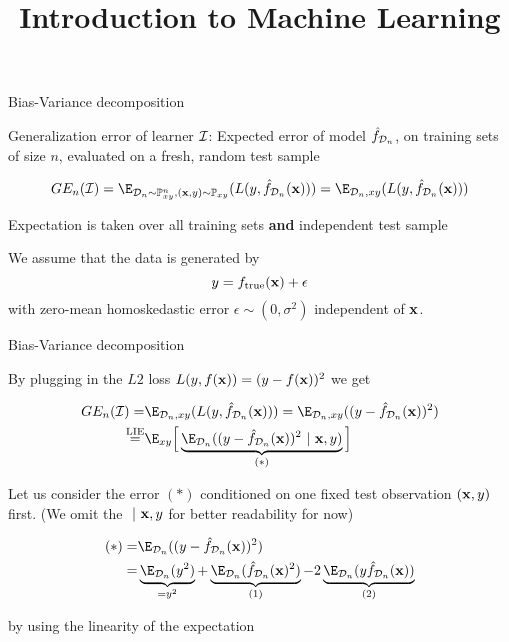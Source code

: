 \documentclass[11pt,compress,t,notes=noshow, xcolor=table]{beamer}
\title{Introduction to Machine Learning}
\begin{document}

\begin{frame}{Bias-Variance decomposition}

Generalization error of learner  $\mathcal{I}$: 
Expected error of model $\hat{f}_{\mathcal{D}_n}$, on training sets of size $n$, evaluated on a fresh, random test sample

$$GE_n(\ind) = \E_{\D_n \sim \Pxy^n, (\xv, y) \sim \Pxy}( L(y, \fh_{\D_n}(\xv)) ) = \E_{\D_n, xy}( L(y, \fh_{\D_n}(\xv)) ) $$

\vfill 

Expectation is taken over all training sets \textbf{and} independent test sample\\

\vfill 

We assume that the data is generated by 
$$
y = f_{\text{true}}(\mathbf{x}) + \epsilon
$$
with zero-mean homoskedastic error $\epsilon \sim (0, \sigma^2)$ independent of $\mathbf{x}$. 

\end{frame}

\begin{frame2}[small]{Bias-Variance decomposition}

By plugging in the $L2$ loss $L(y, f(\mathbf{x})) = (y - f(\mathbf{x}))^2$ we get

\begin{align*}
GE_n(\ind) =& \E_{\D_n, xy}( L(y, \fh_{\D_n}(\xv))) = \E_{\D_n, xy}((y - \fh_{\D_n}(\xv))^2) \\
\stackrel{\text{LIE}}{=}& \E_{xy}\Big[\underbrace{\E_{\D_n}((y - \fh_{\D_n}(\xv))^2~|~ \xv, y)}_{(*)}\Big] 
\end{align*}

Let us consider the error $(*)$ conditioned on one fixed test observation $(\mathbf{x}, y)$ first. (We omit the $~|~\mathbf{x}, y$ for better readability for now)

\begin{align*}
(*) =& \E_{\D_n}((y - \fh_{\D_n}(\xv))^2)\\
=& \underbrace{\E_{\D_n}(y^2)}_{= y^2} + \underbrace{\E_{\D_n}(\fh_{\D_n}(\xv)^2)}_{(1)}  - 2\underbrace{\E_{\D_n}(y\fh_{\D_n}(\xv))}_{(2)} 

\end{align*}

by using the linearity of the expectation  %

\end{frame2}
\end{document}
